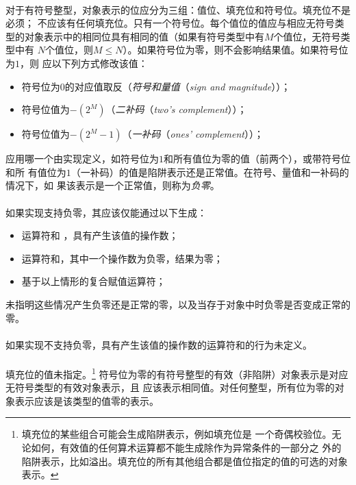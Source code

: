 \paragraph{}
对于有符号整型，对象表示的位应分为三组：值位、填充位和符号位。填充位不是必须；
不应该有任何填充位。只有一个符号位。每个值位的值应与相应无符号类
型的对象表示中的相同位具有相同的值（如果有符号类型中有$M$个值位，无符号类型中有
$N$个值位，则$M \le N$）。如果符号位为零，则不会影响结果值。如果符号位为$1$，则
应以下列方式修改该值：
\begin{itemize}
  \item{符号位为$0$的对应值取反（\textit{符号和量值}（\textit{sign and
    magnitude}））；}
  \item{符号位值为$-(2^M)$（\textit{二补码}（\textit{two's complement}））；}
  \item{符号位值为$-(2^M-1)$（\textit{一补码}（\textit{ones' complement}））；}
\end{itemize}
应用哪一个由实现定义，如符号位为$1$和所有值位为零的值（前两个），或带符号位和所
有值位为$1$（一补码）的值是陷阱表示还是正常值。在符号、量值和一补码的情况下，如
果该表示是一个正常值，则称为\textit{负零}。

\paragraph{}
如果实现支持负零，其应该仅能通过以下生成：
\begin{itemize}
  \item{运算符和
    \tm{\textgreater{}\textgreater{}}，具有产生该值的操作数；}
  \item{运算符和\tm{\%}，其中一个操作数为负零，结果为零；}
  \item{基于以上情形的复合赋值运算符；}
\end{itemize}
未指明这些情况产生负零还是正常的零，以及当存于对象中时负零是否变成正常的零。

\paragraph{}
如果实现不支持负零，具有产生该值的操作数的运算符和\tm{\textgreater{}\textgreater{}}的行为未定义。

\paragraph{}
填充位的值未指定。\footnote{填充位的某些组合可能会生成陷阱表示，例如填充位是
一个奇偶校验位。无论如何，有效值的任何算术运算都不能生成除作为异常条件的一部分之
外的陷阱表示，比如溢出。填充位的所有其他组合都是值位指定的值的可选的对象表示。}
符号位为零的有符号整型的有效（非陷阱）对象表示是对应无符号类型的有效对象表示，且
应该表示相同值。对任何整型，所有位为零的对象表示应该是该类型的值零的表示。

